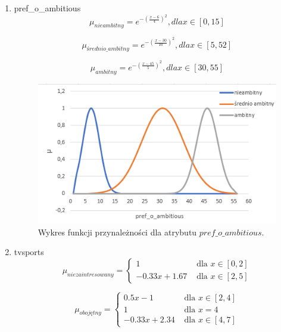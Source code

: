 \documentclass{classrep}
\begin{document}
\begin{enumerate}
  \item pref\_o\_ambitious
  \begin{equation}
    \mu_{nieambitny} = e^{-(\frac{x-6}{4})^2}, dla x \in [0,15]
  \end{equation}

  \begin{equation}
    \mu_{średnio\_ambitny} = e^{-(\frac{x-30}{10})^2}, dla x \in [5,52]
  \end{equation}

  \begin{equation}
    \mu_{ambitny} = e^{-(\frac{x-45}{5})^2}, dla x \in [30,55]
  \end{equation}
  
  \begin{figure}[H]
    \includegraphics{fp_poa.png}
    \caption{Wykres funkcji przynależności dla atrybutu \(pref\_o\_ambitious\).}
    \end{figure}
  
  \item tvsports 
  \begin{equation}
    \mu_{niezaintresowany} =
      \begin{cases}
        1 & \text{ dla } x \in [0,2] \\
        -0.33x+1.67 & \text{ dla } x \in [2,5]       
      \end{cases}  
  \end{equation}

  \begin{equation}
    \mu_{obojętny} =
      \begin{cases}
        0.5x-1 & \text{ dla } x \in [2,4]\\
        1 & \text{ dla } x=4 \\
        -0.33x+2.34 & \text{ dla } x \in [4,7]       
      \end{cases}  
  \end{equation}


\end{enumerate}
\end{document}
